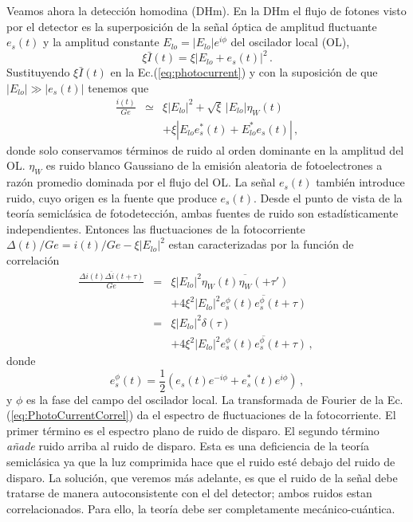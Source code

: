 \documentclass[twocolumn,aps,eqsecnum,showkeys,amsmath]{revtex4}
\begin{document}
Veamos ahora la detecci\'on homodina (DHm). En la DHm el flujo de 
fotones visto por el detector es la superposici\'on de la se\~nal 
\'optica de amplitud fluctuante $e_s(t)$ y la amplitud constante 
$E_{lo} = |E_{lo}| e^{i\phi}$ del oscilador local (OL),  
%
\begin{equation} 	
\xi \bar{I}(t) = \xi |E_{lo} +e_s(t)|^2 \,.  
\end{equation}
Sustituyendo $\xi \bar{I}(t)$ en la Ec.(\ref{eq:photocurrent}) y con la 
suposici\'on de que $|E_{lo}| \gg |e_s(t)|$ tenemos que 
\begin{eqnarray}
\frac{i(t)}{Ge} &\simeq& \xi |E_{lo}|^2 +\sqrt{\xi} \,|E_{lo}| \eta_W(t) 
	\nonumber \\
	&& +\xi |E_{lo} e_s^\ast(t) + E_{lo}^\ast e_s(t)| \,,
\end{eqnarray}
donde solo conservamos t\'erminos de ruido al orden dominante en la 
amplitud del OL. $\eta_W$ es ruido blanco Gaussiano de la emisi\'on 
aleatoria de fotoelectrones a raz\'on promedio dominada por el flujo 
del OL. La se\~nal $e_s(t)$ tambi\'en introduce ruido, cuyo origen es 
la fuente que produce $e_s(t)$. Desde el punto de vista de la teor\'ia 
semicl\'asica de fotodetecci\'on, ambas fuentes de ruido son 
estad\'isticamente independientes. Entonces las fluctuaciones de la 
fotocorriente $\Delta (t)/Ge = i(t)/Ge -\xi |E_{lo}|^2$ estan caracterizadas 
por la funci\'on de correlaci\'on
\begin{eqnarray} \label{eq:PhotoCurrentCorrel}
\frac{ \overline{\Delta i(t) \Delta i(t+\tau)} }{Ge} 
	&=& \xi |E_{lo}|^2 \overline{\eta_W(t) \eta_W(+\tau')} 	  \nonumber \\
	&& +4\xi^2  |E_{lo}|^2 \overline{ e_s^{\phi}(t) e_s^{\phi}(t+\tau) } 
	\nonumber \\
&=& \xi |E_{lo}|^2 \delta(\tau) 	\nonumber \\ 
	&&+4\xi^2  |E_{lo}|^2 \overline{ e_s^{\phi}(t) e_s^{\phi}(t+\tau) } \,, \qquad 
\end{eqnarray}
donde 
%
\begin{equation} 	
e_s^{\phi}(t)  = \frac{1}{2} \left(  e_s(t) e^{-i\phi} + e_s^\ast(t) e^{i\phi} \right) \,, 
\end{equation}
y $\phi$ es la fase del campo del oscilador local. La transformada 
de Fourier de la Ec.(\ref{eq:PhotoCurrentCorrel}) da el espectro de 
fluctuaciones de la fotocorriente. El primer t\'ermino es el espectro plano 
de ruido de disparo. El segundo t\'ermino \textit{a\~nade} ruido arriba al 
ruido de disparo. Esta es una deficiencia de la teor\'ia semicl\'asica ya 
que la luz comprimida hace que el ruido est\'e debajo del ruido de 
disparo. La soluci\'on, que veremos m\'as adelante, es que el ruido de la 
se\~nal debe tratarse de manera autoconsistente con el del detector; 
ambos ruidos estan correlacionados. Para ello, la teor\'ia debe ser 
completamente mec\'anico-cu\'antica.  
\end{document}
